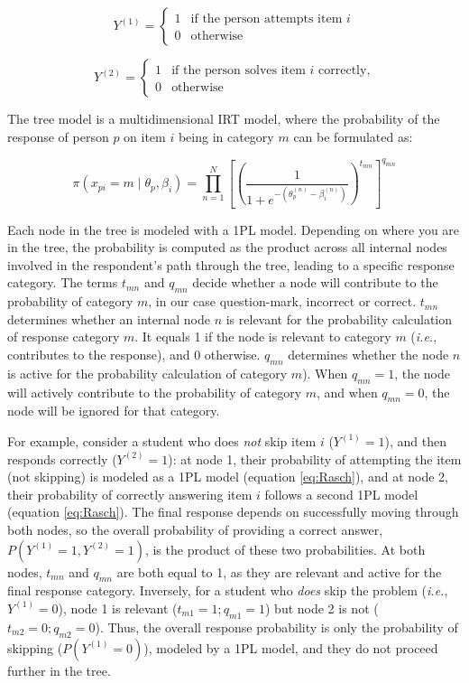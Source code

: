 \documentclass{edm_article}
\begin{document}
\begin{equation}
Y^{(1)} =
\begin{cases} 
1 & \text{if the person attempts item } i \\
0 & \text{otherwise}
\end{cases}
\end{equation}

\begin{equation}
Y^{(2)} =
\begin{cases} 
1 & \text{if the person solves item } i \text{ correctly,} \\
0 & \text{otherwise}
\end{cases}
\label{eq:cases}
\end{equation}

The tree model is a multidimensional IRT model, where the probability of the response of person $p$ on item $i$ being in category $m$ can be formulated as: 

\begin{equation}
\pi(x_{pi} = m \mid \theta_p, \beta_i) = \prod_{n=1}^{N} \left[ \left( \frac{1}{1 + e^{-(\theta_p^{(n)} - \beta_i^{(n)})}} \right)^{t_{mn}} \right]^{q_{mn}}
\label{eq:tree}
\end{equation}

Each node in the tree is modeled with a 1PL model. Depending on where you are in the tree, the probability is computed as the product across all internal nodes involved in the respondent's path through the tree, leading to a specific response category. The terms $t_{mn}$ and $q_{mn}$ decide whether a node will contribute to the probability of category $m$, in our case question-mark, incorrect or correct. $t_{mn}$ determines whether an internal node $n$ is relevant for the probability calculation of response category $m$. It equals 1 if the node is relevant to category $m$ (\textit{i.e.}, contributes to the response), and 0 otherwise.
$q_{mn}$ determines whether the node $n$ is active for the probability calculation of category $m$). When $q_{mn} = 1$, the node will actively contribute to the probability of category $m$, and when $q_{mn} = 0$, the node will be ignored for that category.

For example, consider a student who does \textit{not} skip item $i$ ($Y^{(1)} = 1$), and then responds correctly ($Y^{(2)} = 1$): at node 1, their probability of attempting the item (not skipping) is modeled as a 1PL model (equation \ref{eq:Rasch}), and at node 2, their probability of correctly answering item $i$ follows a second 1PL model (equation \ref{eq:Rasch}). The final response depends on successfully moving through both nodes, so the overall probability of providing a correct answer, $P(Y^{(1)}=1, Y^{(2)}=1)$, is the product of these two probabilities. At both nodes, $t_{mn}$ and $q_{mn}$ are both equal to 1, as they are relevant and active for the final response category. Inversely, for a student who \textit{does} skip the problem (\textit{i.e.}, $Y^{(1)} = 0$), node 1 is relevant ($t_{m1} = 1; q_{m1} = 1$) but node 2 is not ($t_{m2} = 0; q_{m2} = 0$). Thus, the overall response probability is only the probability of skipping ($P(Y^{(1)} = 0)$), modeled by a 1PL model, and they do not proceed further in the tree. 
\end{document}
